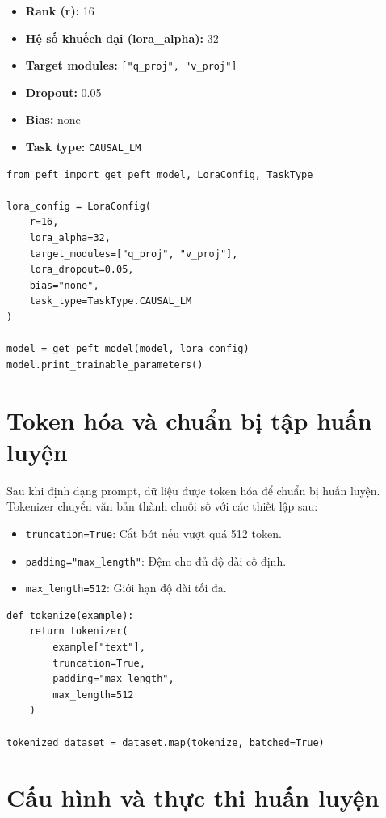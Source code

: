 \documentclass[../DoAn.tex]{subfiles}
\begin{document}
\begin{itemize}
    \item \textbf{Rank (r):} 16
    \item \textbf{Hệ số khuếch đại (lora\_alpha):} 32
    \item \textbf{Target modules:} \texttt{["q\_proj", "v\_proj"]}
    \item \textbf{Dropout:} 0.05
    \item \textbf{Bias:} none
    \item \textbf{Task type:} \texttt{CAUSAL\_LM}
\end{itemize}

\begin{lstlisting}
from peft import get_peft_model, LoraConfig, TaskType

lora_config = LoraConfig(
    r=16,
    lora_alpha=32,
    target_modules=["q_proj", "v_proj"],
    lora_dropout=0.05,
    bias="none",
    task_type=TaskType.CAUSAL_LM
)

model = get_peft_model(model, lora_config)
model.print_trainable_parameters()
\end{lstlisting}

\section{Token hóa và chuẩn bị tập huấn luyện}

Sau khi định dạng prompt, dữ liệu được token hóa để chuẩn bị huấn luyện. Tokenizer chuyển văn bản thành chuỗi số với các thiết lập sau:

\begin{itemize}
    \item \texttt{truncation=True}: Cắt bớt nếu vượt quá 512 token.
    \item \texttt{padding="max\_length"}: Đệm cho đủ độ dài cố định.
    \item \texttt{max\_length=512}: Giới hạn độ dài tối đa.
\end{itemize}

\begin{lstlisting}
def tokenize(example):
    return tokenizer(
        example["text"],
        truncation=True,
        padding="max_length",
        max_length=512
    )

tokenized_dataset = dataset.map(tokenize, batched=True)
\end{lstlisting}

\section{Cấu hình và thực thi huấn luyện}
\end{document}
